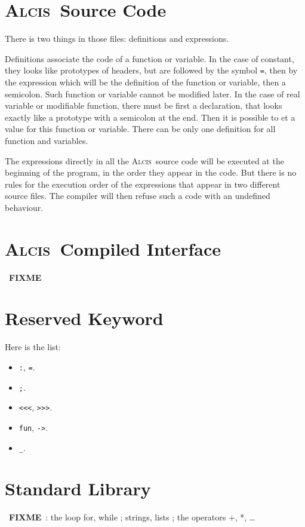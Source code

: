 \documentclass{article}
\newcommand{\Alcis}{\textsc{Alcis}~}
\newcommand{\FIXME}{~\textbf{FIXME}~}
\begin{document}
\section{\Alcis Source Code}

There is two things in those files: definitions and expressions.

Definitions associate the code of a function or variable.
In the case of constant, they looks like prototypes of headers, but are followed by the symbol \lstinline$=$, then by the expression which will be the definition of the function or variable, then a semicolon.
Such function or variable cannot be modified later.
In the case of real variable or modifiable function, there must be first a declaration, that looks exactly like a prototype with a semicolon at the end.
Then it is possible to et a value for this function or variable.
There can be only one definition for all function and variables.

The expressions directly in all the \Alcis source code will be executed at the beginning of the program, in the order they appear in the code.
But there is no rules for the execution order of the expressions that appear in two different source files.
The compiler will then refuse such a code with an undefined behaviour.

\section{\Alcis Compiled Interface}

\FIXME

\section{Reserved Keyword}

Here is the list:
\begin{itemize}
\item \lstinline$:$, \lstinline$=$.
\item \lstinline$;$.
\item \lstinline$<<<$, \lstinline$>>>$.
\item \lstinline$fun$, \lstinline$->$.
\item \lstinline$_$.
\end{itemize}

\section{Standard Library}

\FIXME: the loop for, while ; strings, lists ; the operators +, *, \ldots
\end{document}
